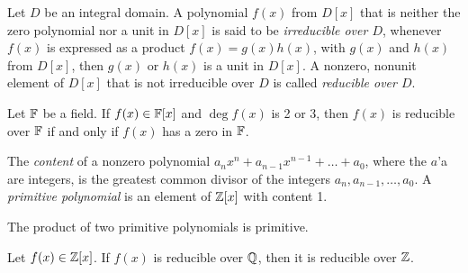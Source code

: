 
\begin{definition}
	Let $D$ be an integral domain. A polynomial $f(x)$ from $D[x]$ that is neither the zero polynomial nor a unit in $D[x]$ is said to be \textit{irreducible over $D$}, whenever $f(x)$ is expressed as a product $f(x) = g(x)h(x)$, with $g(x)$ and $h(x)$ from $D[x]$, then $g(x)$ or $h(x)$ is a unit in $D[x]$. A nonzero, nonunit element of $D[x]$ that is not irreducible over $D$ is called \textit{reducible over $D$}.
\end{definition}

\begin{theorem}
	Let $\mathbb{F}$ be a field. If $f(x) \in \mathbb{F}[x]$ and $\deg f(x)$ is 2 or 3, then $f(x)$ is reducible over $\mathbb{F}$ if and only if $f(x)$ has a zero in $\mathbb{F}$.
\end{theorem}

\begin{definition}
	The \textit{content} of a nonzero polynomial $a_nx^n + a_{n-1}x^{n-1} + \dots + a_0$, where the $a$'a are integers, is the greatest common divisor of the integers $a_n,a_{n-1}, \dots, a_0$. A \textit{primitive polynomial} is an element of $\mathbb{Z}[x]$ with content 1.
\end{definition}

\begin{lemma}
	The product of two primitive polynomials is primitive.
\end{lemma}

\begin{theorem}
	Let $f(x) \in \mathbb{Z}[x]$. If $f(x)$ is reducible over $\mathbb{Q}$, then it is reducible over $\mathbb{Z}$.
\end{theorem}
